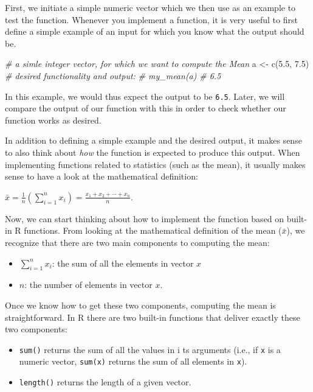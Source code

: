 \documentclass[
  12pt,
]{style/krantz}
\newenvironment{Shaded}{\begin{snugshade}}{\end{snugshade}}
\newcommand{\CommentTok}[1]{\textcolor[rgb]{0.56,0.35,0.01}{\textit{#1}}}
\newcommand{\FloatTok}[1]{\textcolor[rgb]{0.00,0.00,0.81}{#1}}
\newcommand{\FunctionTok}[1]{\textcolor[rgb]{0.00,0.00,0.00}{#1}}
\newcommand{\NormalTok}[1]{#1}
\newcommand{\OtherTok}[1]{\textcolor[rgb]{0.56,0.35,0.01}{#1}}
\providecommand{\tightlist}{%
  \setlength{\itemsep}{0pt}\setlength{\parskip}{0pt}}
\begin{document}
First, we initiate a simple numeric vector which we then use as an example to test the function. Whenever you implement a function, it is very useful to first define a simple example of an input for which you know what the output should be.

\begin{Shaded}
\begin{Highlighting}[]
\CommentTok{\# a simle integer vector, for which we want to compute the Mean}
\NormalTok{a }\OtherTok{\textless{}{-}} \FunctionTok{c}\NormalTok{(}\FloatTok{5.5}\NormalTok{, }\FloatTok{7.5}\NormalTok{)}
\CommentTok{\# desired functionality and output:}
\CommentTok{\# my\_mean(a)}
\CommentTok{\# 6.5}
\end{Highlighting}
\end{Shaded}

In this example, we would thus expect the output to be \texttt{6.5}. Later, we will compare the output of our function with this in order to check whether our function works as desired.

In addition to defining a simple example and the desired output, it makes sense to also think about \emph{how} the function is expected to produce this output. When implementing functions related to statistics (such as the mean), it usually makes sense to have a look at the mathematical definition:

\(\bar{x} = \frac{1}{n}\left (\sum_{i=1}^n{x_i}\right ) = \frac{x_1+x_2+\cdots +x_n}{n}\).

Now, we can start thinking about how to implement the function based on built-in R functions. From looking at the mathematical definition of the mean (\(\bar{x}\)), we recognize that there are two main components to computing the mean:

\begin{itemize}
\tightlist
\item
  \(\sum_{i=1}^n{x_i}\): the sum of all the elements in vector \(x\)
\item
  \(n\): the number of elements in vector \(x\).
\end{itemize}

Once we know how to get these two components, computing the mean is straightforward. In R there are two built-in functions that deliver exactly these two components:

\begin{itemize}
\tightlist
\item
  \texttt{sum()} returns the sum of all the values in i ts arguments (i.e., if \texttt{x} is a numeric vector, \texttt{sum(x)} returns the sum of all elements in \texttt{x}).
\item
  \texttt{length()} returns the length of a given vector.
\end{itemize}
\end{document}

